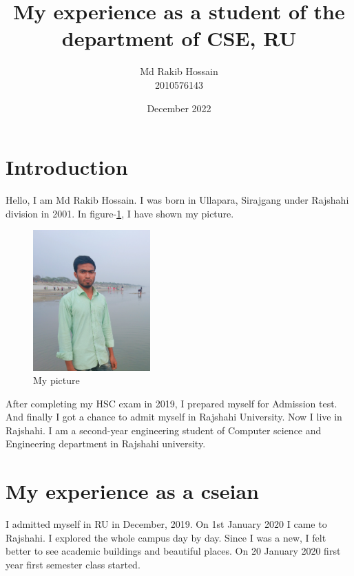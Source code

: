 \documentclass{article}
\title{My experience as a student of the department of CSE, RU}
\author{Md Rakib Hossain\\2010576143}
\date{December 2022}
\begin{document}
\maketitle
\section{Introduction}
Hello, I am Md Rakib Hossain. I was born in Ullapara, Sirajgang under Rajshahi division in 2001. In figure-\ref{fig:a}, I have shown my picture.
\begin{figure}[h]
    \centering
    \includegraphics[width = 0.4\textwidth]{rakib.jpg}
    \caption{My picture}
    \label{fig:a}
\end{figure}
After completing my HSC exam in 2019, I prepared myself for Admission test. And finally I got a chance to admit myself in Rajshahi University. Now I live in Rajshahi. I am a second-year engineering student of Computer science and Engineering department in Rajshahi university.
\section{My experience as a cseian}
I admitted myself in RU in December, 2019. On 1st January 2020 I came to Rajshahi. I explored the whole campus day by day. Since I was a new, I felt better to see academic buildings and beautiful places. On  20 January 2020 first year first semester class started.    
\end{document}
